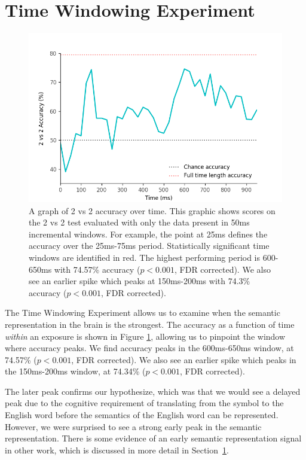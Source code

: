\section{Time Windowing Experiment}
\label{sec:results:timewindowing}

\begin{figure}[t]
  \centering
  \includegraphics[width=0.75\linewidth]{figures/timewindow}
  \caption[\tvt Accuracy over Time]{
    A graph of 2 vs 2 accuracy over time. This graphic shows scores on the 2 vs 
    2 test evaluated with only the data present in 50ms incremental windows.  
    For example, the point at 25ms defines the \tvt accuracy over the 25ms-75ms 
    period. Statistically significant time windows are identified in red. The 
    highest performing period is 600-650ms with 74.57\% accuracy ($p < 0.001$, 
    FDR corrected). We also see an earlier spike which peaks at 150ms-200ms 
    with 74.3\% accuracy ($p < 0.001$, FDR corrected).
  }
  \label{fig:timewindow}
\end{figure}

The Time Windowing Experiment allows us to examine when the semantic 
representation in the brain is the strongest. The \tvt accuracy as a function 
of time \emph{within} an exposure is shown in Figure \ref{fig:timewindow}, 
allowing us to pinpoint the window where accuracy peaks. We find accuracy peaks 
in the 600ms-650ms window, at 74.57\% ($p < 0.001$, FDR corrected). We also see 
an earlier spike which peaks in the 150ms-200ms window, at 74.34\% ($p < 
0.001$, FDR corrected).

The later peak confirms our hypothesize, which was that we would see a delayed
peak due to the cognitive requirement of translating from the symbol to the 
English word before the semantics of the English word can be represented.  
However, we were surprised to see a strong early peak in the semantic 
representation. There is some evidence of an early semantic representation 
signal in other work, which is discussed in more detail in 
Section~\ref{sec:results:timewindowing}.
